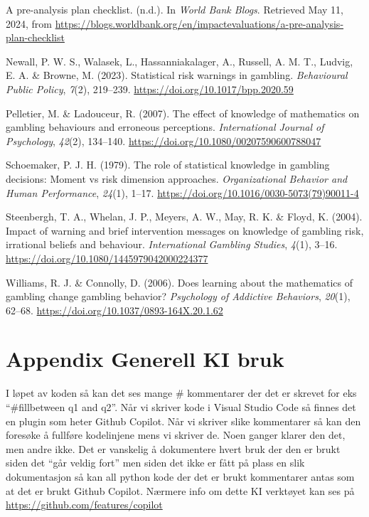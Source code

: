 \documentclass[
  12pt,
  a4paper,
  DIV=11,
  numbers=noendperiod]{scrartcl}
\newlength{\cslhangindent}
\newenvironment{CSLReferences}[2] %
 {\begin{list}{}{%
  \setlength{\itemindent}{0pt}
  \setlength{\leftmargin}{0pt}
  \setlength{\parsep}{0pt}
  \ifodd #1
   \setlength{\leftmargin}{\cslhangindent}
   \setlength{\itemindent}{-1\cslhangindent}
  \fi
  \setlength{\itemsep}{#2\baselineskip}}}
 {\end{list}}
\begin{document}
\label{refs}
\begin{CSLReferences}{1}{0}
A pre-analysis plan checklist. (n.d.). In \emph{World Bank Blogs}.
Retrieved May 11, 2024, from
\url{https://blogs.worldbank.org/en/impactevaluations/a-pre-analysis-plan-checklist}

Newall, P. W. S., Walasek, L., Hassanniakalager, A., Russell, A. M. T.,
Ludvig, E. A. \& Browne, M. (2023). Statistical risk warnings in
gambling. \emph{Behavioural Public Policy}, \emph{7}(2), 219--239.
\url{https://doi.org/10.1017/bpp.2020.59}

Pelletier, M. \& Ladouceur, R. (2007). The effect of knowledge of
mathematics on gambling behaviours and erroneous perceptions.
\emph{International Journal of Psychology}, \emph{42}(2), 134--140.
\url{https://doi.org/10.1080/00207590600788047}

Schoemaker, P. J. H. (1979). The role of statistical knowledge in
gambling decisions: {Moment} vs risk dimension approaches.
\emph{Organizational Behavior and Human Performance}, \emph{24}(1),
1--17. \url{https://doi.org/10.1016/0030-5073(79)90011-4}

Steenbergh, T. A., Whelan, J. P., Meyers, A. W., May, R. K. \& Floyd, K.
(2004). Impact of warning and brief intervention messages on knowledge
of gambling risk, irrational beliefs and behaviour. \emph{International
Gambling Studies}, \emph{4}(1), 3--16.
\url{https://doi.org/10.1080/1445979042000224377}

Williams, R. J. \& Connolly, D. (2006). Does learning about the
mathematics of gambling change gambling behavior? \emph{Psychology of
Addictive Behaviors}, \emph{20}(1), 62--68.
\url{https://doi.org/10.1037/0893-164X.20.1.62}

\end{CSLReferences}

\clearpage

\appendix

\section {Appendix Generell KI bruk}

I løpet av koden så kan det ses mange \# kommentarer der det er skrevet
for eks ``\#fillbetween q1 and q2''. Når vi skriver kode i Visual Studio
Code så finnes det en plugin som heter Github Copilot. Når vi skriver
slike kommentarer så kan den foresøke å fullføre kodelinjene mens vi
skriver de. Noen ganger klarer den det, men andre ikke. Det er vanskelig
å dokumentere hvert bruk der den er brukt siden det ``går veldig fort''
men siden det ikke er fått på plass en slik dokumentasjon så kan all
python kode der det er brukt kommentarer antas som at det er brukt
Github Copilot. Nærmere info om dette KI verktøyet kan ses på
\url{https://github.com/features/copilot}
\end{document}
